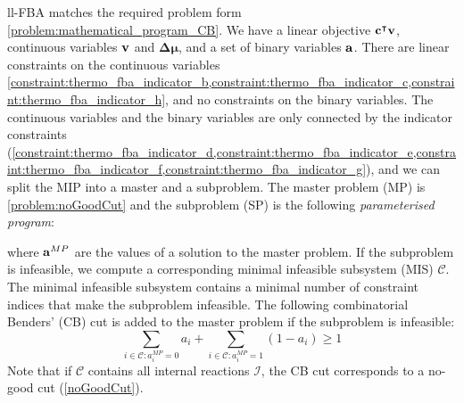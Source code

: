ll-FBA matches the required problem form \cref{problem:mathematical_program_CB}. We have a linear objective $\bold c^\intercal \bold v$, continuous variables $\bold v$ and $\boldsymbol{\Delta \mu}$, and a set of binary variables $\bold a$. There are linear constraints on the continuous variables \cref{constraint:thermo_fba_indicator_b,constraint:thermo_fba_indicator_c,constraint:thermo_fba_indicator_h}, and no constraints on the binary variables. The continuous variables and the binary variables are only connected by the indicator constraints (\cref{constraint:thermo_fba_indicator_d,constraint:thermo_fba_indicator_e,constraint:thermo_fba_indicator_f,constraint:thermo_fba_indicator_g}), and we can split the MIP into a master and a subproblem.
The master problem (MP) is
\cref{problem:noGoodCut}
and the subproblem (SP) is the following \textit{parameterised program}:

\quad where $\bold a^{MP}$ are the values of a solution to the master problem. If the subproblem is infeasible, we compute a corresponding minimal infeasible subsystem (MIS) $\mathcal{C}$. The minimal infeasible subsystem contains a minimal number of constraint indices that make the subproblem infeasible.
The following combinatorial Benders' (CB) cut is added to the master problem if the subproblem is infeasible:
\begin{equation*}
\sum_{i \in \mathcal{C}: a_i^{MP}=0} a_i + \sum_{i \in \mathcal{C}: a_i^{MP}=1} (1-a_i) \geq 1
\end{equation*}
Note that if $\mathcal{C}$ contains all internal reactions $\mathcal{I}$, the CB cut corresponds to a no-good cut (\cref{noGoodCut}).

